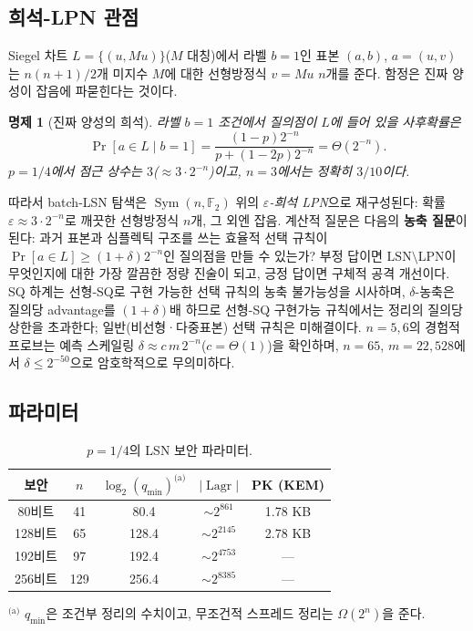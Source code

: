 \documentclass[11pt,a4paper]{article}
\theoremstyle{plain}
\newtheorem{proposition}[theorem]{명제}
\theoremstyle{definition}
\newcommand{\F}{\mathbb{F}}
\DeclareMathOperator{\Lagr}{Lagr}
\begin{document}
\subsection{희석-LPN 관점}

Siegel 차트 $L = \{(u, Mu)\}$($M$ 대칭)에서 라벨 $b=1$인 표본 $(a,b)$, $a=(u,v)$는 $n(n+1)/2$개 미지수 $M$에 대한 선형방정식 $v = Mu$ $n$개를 준다. 함정은 진짜 양성이 잡음에 파묻힌다는 것이다.

\begin{proposition}[진짜 양성의 희석]
라벨 $b=1$ 조건에서 질의점이 $L$에 들어 있을 사후확률은
\[
\Pr[a \in L \mid b=1] = \frac{(1-p)2^{-n}}{p + (1-2p)2^{-n}} = \Theta(2^{-n}).
\]
$p=1/4$에서 점근 상수는 $3$($\approx 3\cdot 2^{-n}$)이고, $n=3$에서는 정확히 $3/10$이다.
\end{proposition}

따라서 batch-LSN 탐색은 $\operatorname{Sym}(n,\F_2)$ 위의 \emph{$\varepsilon$-희석 LPN}으로 재구성된다: 확률 $\varepsilon \approx 3\cdot 2^{-n}$로 깨끗한 선형방정식 $n$개, 그 외엔 잡음. 계산적 질문은 다음의 \textbf{농축 질문}이 된다: 과거 표본과 심플렉틱 구조를 쓰는 효율적 선택 규칙이 $\Pr[a\in L] \ge (1+\delta)2^{-n}$인 질의점을 만들 수 있는가? 부정 답이면 $\mathrm{LSN}\setminus\mathrm{LPN}$이 무엇인지에 대한 가장 깔끔한 정량 진술이 되고, 긍정 답이면 구체적 공격 개선이다. SQ 하계는 선형-SQ로 구현 가능한 선택 규칙의 농축 불가능성을 시사하며, $\delta$-농축은 질의당 advantage를 $(1+\delta)$배 하므로 선형-SQ 구현가능 규칙에서는 정리의 질의당 상한을 초과한다; 일반(비선형·다중표본) 선택 규칙은 미해결이다. $n=5,6$의 경험적 프로브는 예측 스케일링 $\delta \approx c\,m\,2^{-n}$($c=\Theta(1)$)을 확인하며, $n=65$, $m=22{,}528$에서 $\delta \le 2^{-50}$으로 암호학적으로 무의미하다.

\subsection{파라미터}

\begin{table}[ht]
\centering
\caption{$p=1/4$의 LSN 보안 파라미터.}
\begin{tabular}{@{}ccccc@{}}
\hline
보안 & $n$ & $\log_2(q_{\min})^{\text{(a)}}$ & $|\Lagr|$ & PK (KEM) \\
\hline
80비트  & 41  & 80.4  & $\sim 2^{861}$  & 1.78 KB \\
128비트 & 65  & 128.4 & $\sim 2^{2145}$ & 2.78 KB \\
192비트 & 97  & 192.4 & $\sim 2^{4753}$ & --- \\
256비트 & 129 & 256.4 & $\sim 2^{8385}$ & --- \\
\hline
\end{tabular}
\vspace{4pt}

{\footnotesize $^{\text{(a)}}$ $q_{\min}$은 조건부 정리의 수치이고, 무조건적 스프레드 정리는 $\Omega(2^n)$을 준다.}
\end{table}
\end{document}
